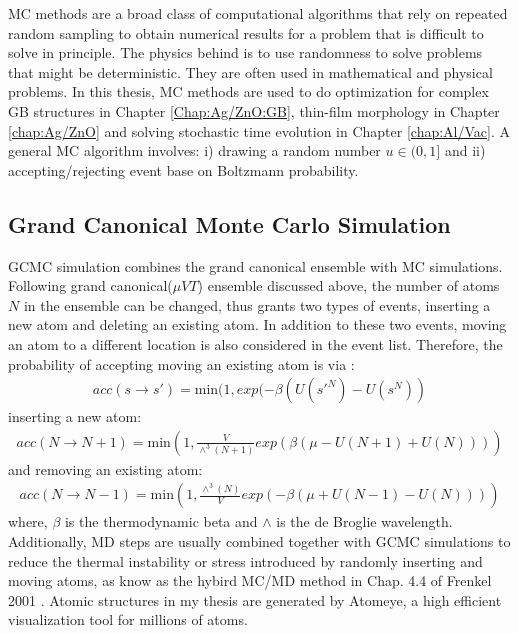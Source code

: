 \ac{MC} methods are a broad class of computational algorithms that rely on repeated random sampling to obtain numerical results for a problem that is difficult to solve in principle. The physics behind is to use randomness to solve problems that might be deterministic. They are often used in mathematical \cite{hubbard2009modeling} and physical \cite{bortz1975new} problems. In this thesis, \ac{MC} methods are used to do optimization for complex \ac{GB} structures in Chapter \ref{Chap:Ag/ZnO:GB}, thin-film morphology in Chapter \ref{chap:Ag/ZnO} and solving stochastic time evolution in Chapter \ref{chap:Al/Vac}. A general \ac{MC} algorithm involves: i) drawing a random number $u \in (0,1]$ and ii) accepting/rejecting event base on Boltzmann probability.

\subsection{Grand Canonical Monte Carlo Simulation}
\label{Chap:Mech:GCMC:GCMC}

\ac{GCMC} simulation combines the grand canonical ensemble with \ac{MC} simulations. Following grand canonical($\mu VT$) ensemble discussed above, the number of atoms $N$ in the ensemble can be changed, thus grants two types of events, inserting a new atom and deleting an existing atom. In addition to these two events, moving an atom to a different location is also considered in the event list. Therefore, the probability of accepting moving an existing atom is via \cite{frenkel2001understanding}:
\begin{align}
acc(s \rightarrow s') = \text{min}(1, exp(-\beta(U(s'^N) - U(s^N))
\label{Chap:Meth:eq:acc:move}
\end{align}
inserting a new atom:
\begin{align}
acc(N \rightarrow N+1) = \text{min}(1, \frac{V}{\wedge^3(N+1)}exp(\beta(\mu - U(N + 1) + U(N)))) \label{Chap:Meth:eq:acc:insert}
\end{align}
and removing an existing atom:
\begin{align}
acc(N \rightarrow N-1) = \text{min}(1, \frac{\wedge^3(N)}{V}exp(-\beta(\mu + U(N - 1) - U(N)))) \label{Chap:Meth:eq:acc:remove}
\end{align}
where, $\beta$ is the thermodynamic beta and $\wedge$ is the de Broglie wavelength. Additionally, \ac{MD} steps are usually combined together with \ac{GCMC} simulations to reduce the thermal instability or stress introduced by randomly inserting and moving atoms, as know as the hybird \ac{MC}/\ac{MD} method in Chap. 4.4 of Frenkel 2001 \cite{frenkel2001understanding}. Atomic structures in my thesis are generated by Atomeye, a high efficient visualization tool for millions of atoms. \cite{li2003atomeye}